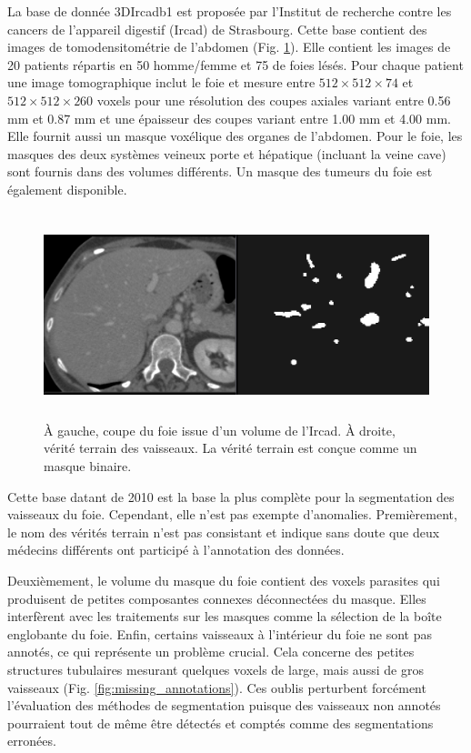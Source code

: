 La base de donnée 3DIrcadb1 est proposée par l'Institut de recherche contre les cancers de l'appareil digestif (Ircad) de Strasbourg. Cette base contient des images de tomodensitométrie de l'abdomen (Fig. \ref{fig:Ircad_examples}). Elle contient les images de 20 patients répartis en 50 \percent{}homme/femme et 75 \percent{}de foies lésés. Pour chaque patient une image tomographique inclut le foie et mesure entre $512 \times 512 \times 74$ et $512 \times 512 \times 260$ voxels pour une résolution des coupes axiales variant entre 0.56 mm et 0.87 mm et une épaisseur des coupes variant entre 1.00 mm et 4.00 mm. Elle fournit aussi un masque voxélique des organes de l'abdomen. Pour le foie, les masques des deux systèmes veineux porte et hépatique (incluant la veine cave) sont fournis dans des volumes différents. Un masque des tumeurs du foie est également disponible.

\begin{figure}
    \centering
    \includegraphics[height=6cm]{Images/Ircad_examples.png}
    \caption{À gauche, coupe du foie issue d'un volume de l'Ircad. À droite, vérité terrain des vaisseaux. La vérité terrain est conçue comme un masque binaire.}
    \label{fig:Ircad_examples}
\end{figure}

Cette base datant de 2010 est la base la plus complète pour la segmentation des vaisseaux du foie. Cependant, elle n'est pas exempte d'anomalies. Premièrement, le nom des vérités terrain n'est pas consistant et indique sans doute que deux médecins différents ont participé à l'annotation des données. 

Deuxièmement, le volume du masque du foie contient des voxels parasites qui produisent de petites composantes connexes déconnectées du masque. Elles interfèrent avec les traitements sur les masques comme la sélection de la boîte englobante du foie.
 Enfin, certains vaisseaux à l'intérieur du foie ne sont pas annotés, ce qui représente un problème crucial. Cela concerne des petites structures tubulaires mesurant quelques voxels de large, mais aussi de gros vaisseaux (Fig. \ref{fig:missing_annotations}). Ces oublis perturbent forcément l'évaluation des méthodes de segmentation puisque des vaisseaux non annotés pourraient tout de même être détectés et comptés comme des segmentations erronées. 

